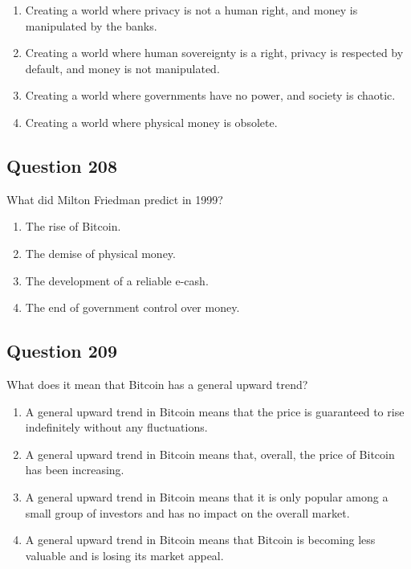 \documentclass[12pt,a4paper]{article}
\begin{document}
\begin{enumerate}[label=\Alph*., leftmargin=*]
\item Creating a world where privacy is not a human right, and money is manipulated by the banks.
\item Creating a world where human sovereignty is a right, privacy is respected by default, and money is not manipulated.
\item Creating a world where governments have no power, and society is chaotic.
\item Creating a world where physical money is obsolete.
\end{enumerate}

\bigskip


\subsection*{Question 208}
What did Milton Friedman predict in 1999?

\begin{enumerate}[label=\Alph*., leftmargin=*]
\item The rise of Bitcoin.
\item The demise of physical money.
\item The development of a reliable e-cash.
\item The end of government control over money.
\end{enumerate}

\bigskip


\subsection*{Question 209}
What does it mean that Bitcoin has a general upward trend?

\begin{enumerate}[label=\Alph*., leftmargin=*]
\item A general upward trend in Bitcoin means that the price is guaranteed to rise indefinitely without any fluctuations.
\item A general upward trend in Bitcoin means that, overall, the price of Bitcoin has been increasing.
\item A general upward trend in Bitcoin means that it is only popular among a small group of investors and has no impact on the overall market.
\item A general upward trend in Bitcoin means that Bitcoin is becoming less valuable and is losing its market appeal.
\end{enumerate}
\end{document}
